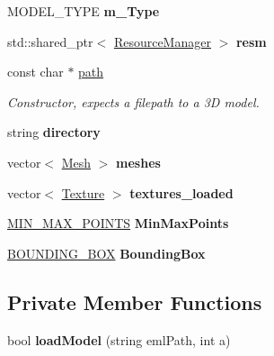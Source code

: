 \begin{DoxyCompactItemize}
\item 
M\+O\+D\+E\+L\+\_\+\+T\+Y\+PE {\bfseries m\+\_\+\+Type}\hypertarget{class_model_a7d8ac75c6ab0c5c63f97571f33095924}{}\label{class_model_a7d8ac75c6ab0c5c63f97571f33095924}

\item 
std\+::shared\+\_\+ptr$<$ \hyperlink{class_resource_manager}{Resource\+Manager} $>$ {\bfseries resm}\hypertarget{class_model_af175189cc681cfc69faf76e2d2ed78a1}{}\label{class_model_af175189cc681cfc69faf76e2d2ed78a1}

\item 
const char $\ast$ \hyperlink{class_model_af94ddde9af2f1fcee96a5aca53e48ed1}{path}
\begin{DoxyCompactList}\small\item\em Constructor, expects a filepath to a 3D model. \end{DoxyCompactList}\item 
string {\bfseries directory}\hypertarget{class_model_a5d77b67392e10756ca9c5075b2abedea}{}\label{class_model_a5d77b67392e10756ca9c5075b2abedea}

\item 
vector$<$ \hyperlink{class_mesh}{Mesh} $>$ {\bfseries meshes}\hypertarget{class_model_a8ff9e88cc08d20ac95168a6a61458d98}{}\label{class_model_a8ff9e88cc08d20ac95168a6a61458d98}

\item 
vector$<$ \hyperlink{struct_texture}{Texture} $>$ {\bfseries textures\+\_\+loaded}\hypertarget{class_model_aa0d87cb976812a96da160a85d7a610e8}{}\label{class_model_aa0d87cb976812a96da160a85d7a610e8}

\item 
\hyperlink{struct_m_i_n___m_a_x___p_o_i_n_t_s}{M\+I\+N\+\_\+\+M\+A\+X\+\_\+\+P\+O\+I\+N\+TS} {\bfseries Min\+Max\+Points}\hypertarget{class_model_a4fb7f2a4cd72a2d800219107187e07f2}{}\label{class_model_a4fb7f2a4cd72a2d800219107187e07f2}

\item 
\hyperlink{struct_model_1_1_b_o_u_n_d_i_n_g___b_o_x}{B\+O\+U\+N\+D\+I\+N\+G\+\_\+\+B\+OX} {\bfseries Bounding\+Box}\hypertarget{class_model_abda72709e3aa14066e39f4ccd02f9911}{}\label{class_model_abda72709e3aa14066e39f4ccd02f9911}

\end{DoxyCompactItemize}
\subsection*{Private Member Functions}
\begin{DoxyCompactItemize}
\item 
bool {\bfseries load\+Model} (string eml\+Path, int a)\hypertarget{class_model_a7eff5466b93a48b22e71f9b57c88c6ad}{}\label{class_model_a7eff5466b93a48b22e71f9b57c88c6ad}

\end{DoxyCompactItemize}


